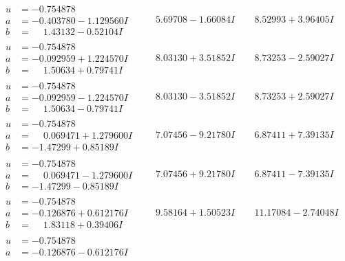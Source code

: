 \documentclass[1p]{elsarticle_modified}
\theoremstyle{definition}
\begin{document}
$$\begin{array}{c|c|c}
\begin{aligned}
u &= -0.754878\phantom{ +0.000000I} \\
a &= -0.403780 - 1.129560 I \\
b &= \phantom{-}1.43132 - 0.52104 I\end{aligned}
 & \phantom{-}5.69708 - 1.66084 I & \phantom{-}8.52993 + 3.96405 I \\ \hline\begin{aligned}
u &= -0.754878\phantom{ +0.000000I} \\
a &= -0.092959 + 1.224570 I \\
b &= \phantom{-}1.50634 + 0.79741 I\end{aligned}
 & \phantom{-}8.03130 + 3.51852 I & \phantom{-}8.73253 - 2.59027 I \\ \hline\begin{aligned}
u &= -0.754878\phantom{ +0.000000I} \\
a &= -0.092959 - 1.224570 I \\
b &= \phantom{-}1.50634 - 0.79741 I\end{aligned}
 & \phantom{-}8.03130 - 3.51852 I & \phantom{-}8.73253 + 2.59027 I \\ \hline\begin{aligned}
u &= -0.754878\phantom{ +0.000000I} \\
a &= \phantom{-}0.069471 + 1.279600 I \\
b &= -1.47299 + 0.85189 I\end{aligned}
 & \phantom{-}7.07456 - 9.21780 I & \phantom{-}6.87411 + 7.39135 I \\ \hline\begin{aligned}
u &= -0.754878\phantom{ +0.000000I} \\
a &= \phantom{-}0.069471 - 1.279600 I \\
b &= -1.47299 - 0.85189 I\end{aligned}
 & \phantom{-}7.07456 + 9.21780 I & \phantom{-}6.87411 - 7.39135 I \\ \hline\begin{aligned}
u &= -0.754878\phantom{ +0.000000I} \\
a &= -0.126876 + 0.612176 I \\
b &= \phantom{-}1.83118 + 0.39406 I\end{aligned}
 & \phantom{-}9.58164 + 1.50523 I & \phantom{-}11.17084 - 2.74048 I \\ \hline\begin{aligned}
u &= -0.754878\phantom{ +0.000000I} \\
a &= -0.126876 - 0.612176 I \\

\end{aligned}
\end{array}$$
\end{document}
